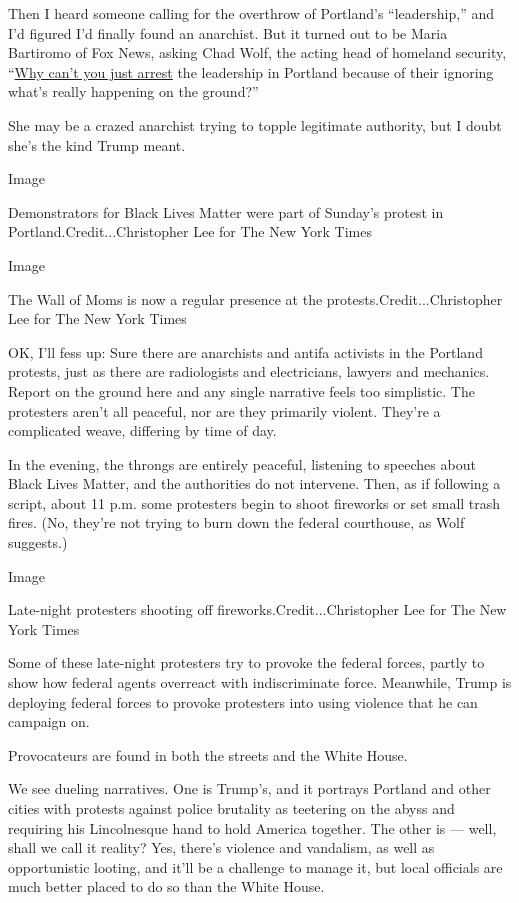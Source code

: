 Then I heard someone calling for the overthrow of Portland's
``leadership,'' and I'd figured I'd finally found an anarchist. But it
turned out to be Maria Bartiromo of Fox News, asking Chad Wolf, the
acting head of homeland security,
``\href{https://twitter.com/revrrlewis/status/1287408409357295617}{Why
can't you just arrest} the leadership in Portland because of their
ignoring what's really happening on the ground?''

She may be a crazed anarchist trying to topple legitimate authority, but
I doubt she's the kind Trump meant.

Image

Demonstrators for Black Lives Matter were part of Sunday's protest in
Portland.Credit...Christopher Lee for The New York Times

Image

The Wall of Moms is now a regular presence at the
protests.Credit...Christopher Lee for The New York Times

OK, I'll fess up: Sure there are anarchists and antifa activists in the
Portland protests, just as there are radiologists and electricians,
lawyers and mechanics. Report on the ground here and any single
narrative feels too simplistic. The protesters aren't all peaceful, nor
are they primarily violent. They're a complicated weave, differing by
time of day.

In the evening, the throngs are entirely peaceful, listening to speeches
about Black Lives Matter, and the authorities do not intervene. Then, as
if following a script, about 11 p.m. some protesters begin to shoot
fireworks or set small trash fires. (No, they're not trying to burn down
the federal courthouse, as Wolf suggests.)

Image

Late-night protesters shooting off fireworks.Credit...Christopher Lee
for The New York Times

Some of these late-night protesters try to provoke the federal forces,
partly to show how federal agents overreact with indiscriminate force.
Meanwhile, Trump is deploying federal forces to provoke protesters into
using violence that he can campaign on.

Provocateurs are found in both the streets and the White House.

We see dueling narratives. One is Trump's, and it portrays Portland and
other cities with protests against police brutality as teetering on the
abyss and requiring his Lincolnesque hand to hold America together. The
other is --- well, shall we call it reality? Yes, there's violence and
vandalism, as well as opportunistic looting, and it'll be a challenge to
manage it, but local officials are much better placed to do so than the
White House.

